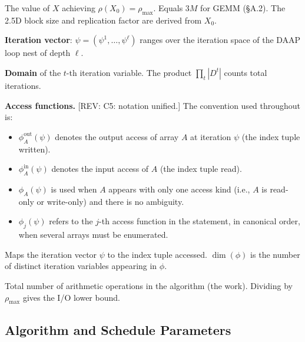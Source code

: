 \documentclass[11pt]{article}
\newcommand{\REV}[1]{\textcolor{blue!60!black}{\small\textsf{[REV: #1]}}}
\begin{document}
\begin{description}[leftmargin=3.5em, labelwidth=3em, labelsep=0.5em,
                    style=nextline, font=\normalfont\itshape]
\item[$X_0$] The value of $X$ achieving $\rho(X_0) = \rho_{\max}$.
  Equals $3M$ for GEMM (\S A.2). The 2.5D block size and replication
  factor are derived from $X_0$.

\item[$\psi$] \textbf{Iteration vector}: $\psi = (\psi^1, \ldots, \psi^\ell)$
  ranges over the iteration space of the DAAP loop nest of depth $\ell$.

\item[$D^t$] \textbf{Domain} of the $t$-th iteration variable. The
  product $\prod_t |D^t|$ counts total iterations.

\item[$\phi_j,\;\phi^{\mathrm{out}}_A,\;\phi^{\mathrm{in}}_A,\;\phi_A$]
  \textbf{Access functions.} \REV{C5: notation unified.} The convention
  used throughout is:
  \begin{itemize}[leftmargin=2em]
    \item $\phi^{\mathrm{out}}_A(\psi)$ denotes the output access of
      array $A$ at iteration $\psi$ (the index tuple written).
    \item $\phi^{\mathrm{in}}_A(\psi)$ denotes the input access of $A$
      (the index tuple read).
    \item $\phi_A(\psi)$ is used when $A$ appears with only one access
      kind (i.e., $A$ is read-only or write-only) and there is no
      ambiguity.
    \item $\phi_j(\psi)$ refers to the $j$-th access function in the
      statement, in canonical order, when several arrays must be
      enumerated.
  \end{itemize}
  Maps the iteration vector $\psi$ to the index tuple accessed.
  $\dim(\phi)$ is the number of distinct iteration variables appearing
  in $\phi$.

\item[$|V|$] Total number of arithmetic operations in the algorithm
  (the work). Dividing by $\rho_{\max}$ gives the I/O lower bound.

\end{description}

\subsection*{Algorithm and Schedule Parameters}
\end{document}
